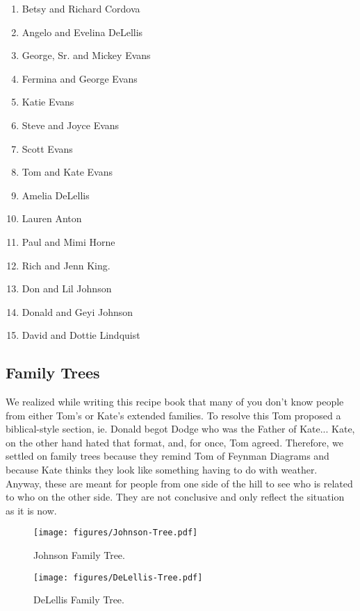 \documentclass[12pt]{article}
\begin{document}
\begin{enumerate}
 \color{red}
 \itemsep0pt
 \parskip1pt
\item Betsy and Richard Cordova %
\item Angelo and Evelina DeLellis
\item George, Sr. and Mickey Evans
\item Fermina and George Evans %
\item Katie Evans
\item Steve and Joyce Evans
\item Scott Evans
\item Tom and Kate Evans %
\item Amelia DeLellis
\item Lauren Anton
\item Paul and Mimi Horne %
\item Rich and Jenn King.
\item Don and Lil Johnson
\item Donald and Geyi Johnson
\item David and Dottie Lindquist
\end{enumerate}

\subsection{Family Trees}

{\color{red}
We realized while writing this recipe book that many of you don't know people from either Tom's or Kate's extended families.  To resolve this Tom proposed a biblical-style section, ie. Donald begot Dodge who was the Father of Kate...  Kate, on the other hand hated that format, and, for once, Tom agreed.  Therefore, we settled on family trees because they remind Tom of Feynman Diagrams and because Kate thinks they look like something having to do with weather.  Anyway, these are meant for people from one side of the hill to see who is related to who on the other side.
They are not conclusive and only reflect the situation as it is now.
}

\begin{figure}
    \centering
    \texttt{[image: figures/Johnson-Tree.pdf]}
    \caption{Johnson Family Tree.}
    \label{fig:johnson-tree}
\end{figure}

\begin{figure}
    \centering
    \texttt{[image: figures/DeLellis-Tree.pdf]}
    \caption{DeLellis Family Tree.}
    \label{fig:delellis-tree}
\end{figure}

\printindex

\end{document}
